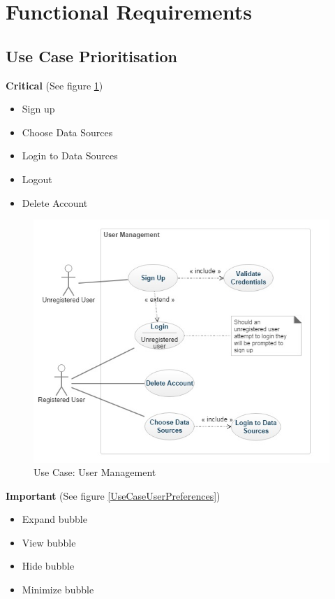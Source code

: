 \documentclass[hidelinks,english]{article}
\begin{document}
	\section{Functional Requirements}		
		\subsection{Use Case Prioritisation}
			\textbf{Critical} (See figure \ref{UseCaseUserManagement})
			\begin{itemize}
			    \item Sign up
			    \item Choose Data Sources
			    \item Login to Data Sources
			    \item Logout
			    \item Delete Account
			\end{itemize}
			\begin{figure}[!h]
				\includegraphics[width=\linewidth]{UserManagement.jpg}
				\caption{Use Case: User Management}
				\label{UseCaseUserManagement}
			\end{figure}
			\textbf{Important} (See figure \ref{UseCaseUserPreferences})
			\begin{itemize}
			    \item Expand bubble
			   	\item View bubble
			    \item Hide bubble
			    \item Minimize bubble
			\end{itemize}
\end{document}
